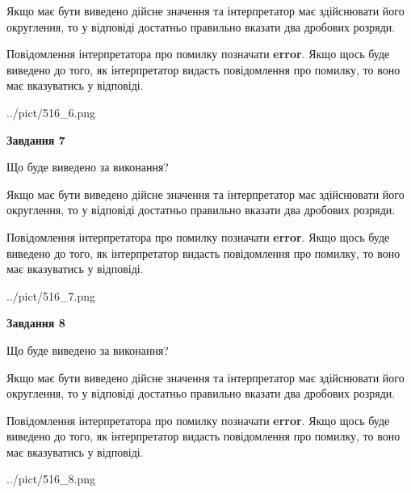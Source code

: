 \documentclass[12pt, ukrainian]{article}
\begin{document}
{\begin {Large}
Якщо має бути виведено дійсне значення та інтерпретатор має здійснювати його округлення, 
то у відповіді достатньо правильно вказати два дробових розряди.

Повідомлення інтерпретатора про помилку позначати \textbf{error}.
Якщо щось буде виведено до того, як інтерпретатор видасть повідомлення про помилку, 
то воно має вказуватись у відповіді. \par

\begin{center}
	{../pict/516_6.png}
\end{center}
\newpage

{\begin {center}\textbf{Завдання 7}\end {center}}\par
Що буде виведено за виконання? \par

Якщо має бути виведено дійсне значення та інтерпретатор має здійснювати його округлення, 
то у відповіді достатньо правильно вказати два дробових розряди.

Повідомлення інтерпретатора про помилку позначати \textbf{error}.
Якщо щось буде виведено до того, як інтерпретатор видасть повідомлення про помилку, 
то воно має вказуватись у відповіді. \par

\begin{center}
	{../pict/516_7.png}
\end{center}
\newpage

{\begin {center}\textbf{Завдання 8}\end {center}}\par
Що буде виведено за виконання? \par

Якщо має бути виведено дійсне значення та інтерпретатор має здійснювати його округлення, 
то у відповіді достатньо правильно вказати два дробових розряди.

Повідомлення інтерпретатора про помилку позначати \textbf{error}.
Якщо щось буде виведено до того, як інтерпретатор видасть повідомлення про помилку, 
то воно має вказуватись у відповіді. \par

\begin{center}
	{../pict/516_8.png}
\end{center}
\newpage


\end{Large}}
\end{document}
